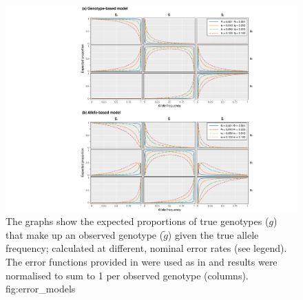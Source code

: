 

\begin{figure}[!htbp]
\includegraphics[width=\textwidth]{./img/ch4/error_models}
{The graphs show the expected proportions of true genotypes ($g$) that make up an observed genotype ($\tilde{g}$) given the true allele frequency; calculated at different, nominal error rates (see legend).
The error functions provided in  were used as in  and results were normalised to sum to 1 per observed genotype (columns).\AdditionLabel}
{fig:error_models}
\end{figure}

